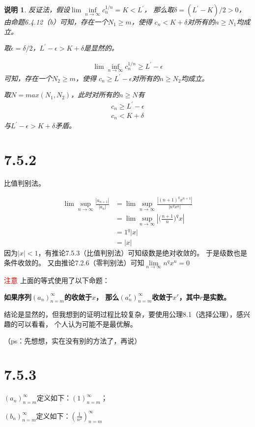 \documentclass{article}
\theoremstyle{mystyle}
\newtheorem*{zremark}{说明}
\begin{document}
\begin{zremark}
  反证法，假设$\lim \inf\limits_{n \rightarrow \infty} c_n^{1/n} = K < L^\prime$，
  那么取$\delta = (L^\prime - K) /2  > 0$，由命题6.4.12（b）可知，存在一个$N_1 \geq m$，使得
  $c_n < K + \delta$对所有的$n \geq N_1$均成立。

  取$\epsilon = \delta /2$，$L^\prime - \epsilon > K + \delta$是显然的。

  \begin{align*}
    \lim \inf\limits_{n \rightarrow \infty} c_n^{1/n} \geq L^\prime - \epsilon
  \end{align*}可知，存在一个$N_2 \geq m$，使得
  $c_n \geq L^\prime - \epsilon$对所有的$n \geq N_2$均成立。

  取$N = max(N_1, N_2)$，此时对所有的$n \geq N$有
  \begin{align}
    c_n \geq L^\prime - \epsilon \\
    c_n < K + \delta
  \end{align}
  与$L^\prime - \epsilon > K + \delta$矛盾。
\end{zremark}

\section*{7.5.2}

比值判别法。

\begin{align*}
  \lim\sup\limits_{n \rightarrow \infty}\frac{|a_{n+1}|}{|a_{n}|}
   & = \lim\sup\limits_{n \rightarrow \infty}\frac{|(n+1)^qx^{n+1}|}{|n^qx^{n}|} \\
   & = \lim\sup\limits_{n \rightarrow \infty}|\big(\frac{n+1}{n}\big)^qx|        \\
   & = 1^q |x|                                                                   \\
   & = |x|
\end{align*}
因为$|x| < 1$，有推论7.5.3（比值判别法）可知级数是绝对收敛的。
于是级数也是条件收敛的。
又由推论7.2.6（零判别法）可知$\lim\limits_{n \rightarrow \infty}n^qx^n = 0$


\textcolor{red}{注意}
上面的等式使用了以下命题：

\textbf{如果序列$(a_n)_{n=m}^\infty$的收敛于$x$，
  那么$(a_n^r)_{n=m}^\infty$收敛于$x^r$，其中$r$是实数。}

结论是显然的，但我想到的证明过程比较复杂，要使用公理8.1（选择公理），感兴趣的可以看看，
个人认为可能不是最优解。

（ps：先想想，实在没有别的方法了，再说）


\section*{7.5.3}

$(a_n)_{n=m}^\infty$定义如下：$(1)_{n=m}^\infty$；

$(b_n)_{n=m}^\infty$定义如下：$(\frac{1}{n^2})_{n=m}^\infty$
\end{document}

